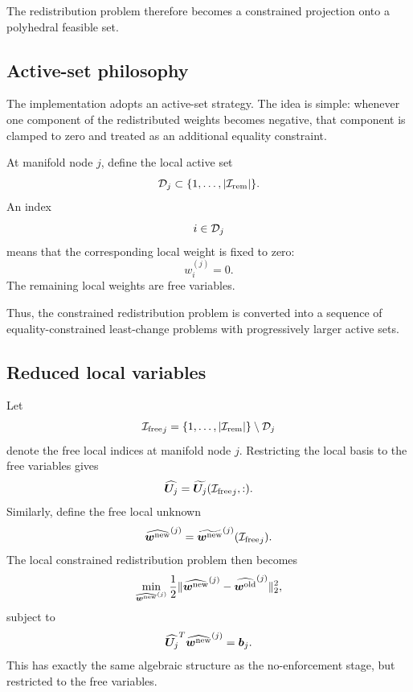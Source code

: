 \documentclass[11pt,a4paper]{article}
\begin{document}
The redistribution problem therefore becomes a constrained projection onto a
polyhedral feasible set.

\subsection{Active-set philosophy}

The implementation adopts an active-set strategy. The idea is simple: whenever
one component of the redistributed weights becomes negative, that component is
clamped to zero and treated as an additional equality constraint.

At manifold node $j$, define the local active set
\[
        \mathcal{D}_j
        \subset
        \{1,\ldots,|\mathcal{I}_{\mathrm{rem}}|\}.
\]
An index
\[
        i\in\mathcal{D}_j
\]
means that the corresponding local weight is fixed to zero:
\[
        w_i^{(j)}=0.
\]
The remaining local weights are free variables.

Thus, the constrained redistribution problem is converted into a sequence of
equality-constrained least-change problems with progressively larger active
sets.

\subsection{Reduced local variables}

Let
\[
        {\mathcal{I}_{\mathrm{free}}}_j
        =
        \{1,\ldots,|\mathcal{I}_{\mathrm{rem}}|\}\setminus\mathcal{D}_j
\]
denote the free local indices at manifold node $j$. Restricting the local basis
to the free variables gives
\[
        \widehat{\bm U_j}
        =
        \widetilde{\bm U_j}({\mathcal{I}_{\mathrm{free}}}_j,:).
\]
Similarly, define the free local unknown
\[
        \widehat{\bm w^{\mathrm{new}}}^{(j)}
        =
        \widetilde{\bm w^{\mathrm{new}}}^{(j)}({\mathcal{I}_{\mathrm{free}}}_j).
\]
The local constrained redistribution problem then becomes
\[
        \min_{\widehat{\bm w^{\mathrm{new}}}^{(j)}}
        \frac{1}{2}
        \|
        \widehat{\bm w^{\mathrm{new}}}^{(j)}
        -
        \widehat{\bm w^{\mathrm{old}}}^{(j)}
        \|_2^2,
\]
subject to
\[
        {\widehat{\bm U_j}}^T
        \widehat{\bm w^{\mathrm{new}}}^{(j)}
        =
        \bm b_j.
        \label{eq:free_active_system}
\]
This has exactly the same algebraic structure as the no-enforcement stage, but
restricted to the free variables.
\end{document}
